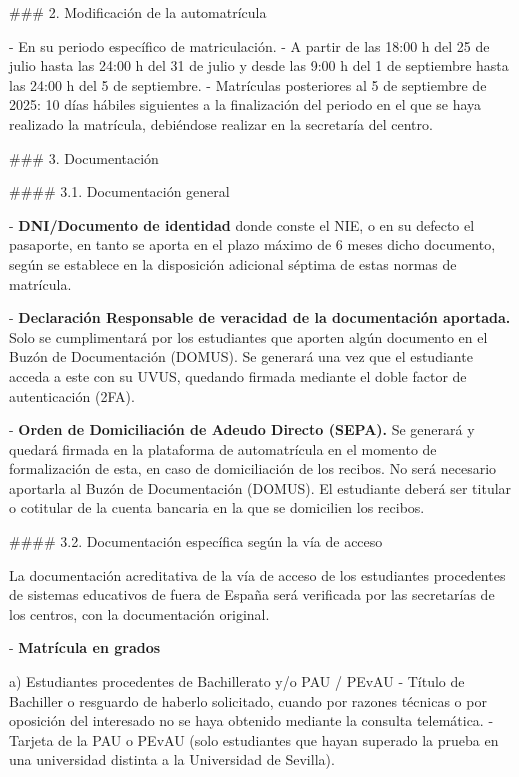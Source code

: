 \documentclass{article}
\begin{document}
\begin{itemize}
\begin{itemize}
\begin{scriptsize}
                  \#\#\# 2. Modificación de la automatrícula

                  - En su periodo específico de matriculación.
                  - A partir de las 18:00 h del 25 de julio hasta las 24:00 h del 31 de julio y desde las 9:00 h del 1 de septiembre hasta las 24:00 h del 5 de septiembre.
                  - Matrículas posteriores al 5 de septiembre de 2025: 10 días hábiles siguientes a la finalización del periodo en el que se haya realizado la matrícula, debiéndose realizar en la secretaría del centro.

                  \#\#\# 3. Documentación

                  \#\#\#\# 3.1. Documentación general

                  - \textbf{DNI/Documento de identidad} donde conste el NIE, o en su defecto el pasaporte, en tanto se aporta en el plazo máximo de 6 meses dicho documento, según se establece en la disposición adicional séptima de estas normas de matrícula.

                  - \textbf{Declaración Responsable de veracidad de la documentación aportada.} Solo se cumplimentará por los estudiantes que aporten algún documento en el Buzón de Documentación (DOMUS). Se generará una vez que el estudiante acceda a este con su UVUS, quedando firmada mediante el doble factor de autenticación (2FA).

                  - \textbf{Orden de Domiciliación de Adeudo Directo (SEPA).} Se generará y quedará firmada en la plataforma de automatrícula en el momento de formalización de esta, en caso de domiciliación de los recibos. No será necesario aportarla al Buzón de Documentación (DOMUS). El estudiante deberá ser titular o cotitular de la cuenta bancaria en la que se domicilien los recibos.

                  \#\#\#\# 3.2. Documentación específica según la vía de acceso

                  La documentación acreditativa de la vía de acceso de los estudiantes procedentes de sistemas educativos de fuera de España será verificada por las secretarías de los centros, con la documentación original.

                  - \textbf{Matrícula en grados}

                  a) Estudiantes procedentes de Bachillerato y/o PAU / PEvAU
                  - Título de Bachiller o resguardo de haberlo solicitado, cuando por razones técnicas o por oposición del interesado no se haya obtenido mediante la consulta telemática.
                  - Tarjeta de la PAU o PEvAU (solo estudiantes que hayan superado la prueba en una universidad distinta a la Universidad de Sevilla).


\end{scriptsize}
\end{itemize}
\end{itemize}
\end{document}
